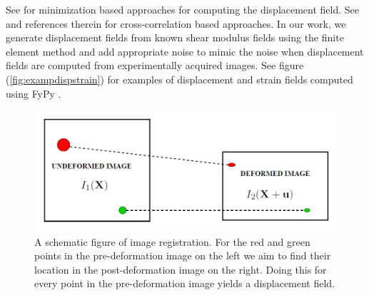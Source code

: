 \documentclass[12pt]{article}
\begin{document}
See \cite{paper:richards2009,paper:gokhale2004,paper:pellot-barakat2004} for minimization based approaches for computing the displacement field. See \cite{paper:ophir1991,paper:ophir1996,paper:alam1998} and references therein for cross-correlation based approaches. In our work, we generate displacement fields from known shear modulus fields using the finite element method \cite{book:hugheslinear,book:fishbelytschko} and add appropriate noise to mimic the noise when displacement fields are computed from experimentally acquired images. See figure (\ref{fig:exampdispstrain}) for examples of displacement and strain fields computed using FyPy \cite{misc:fypy}.
%
\begin{figure}[h]
  \centering
  \includegraphics[totalheight=4cm]{Figures/regist.png}
  \caption{\label{fig:registschematic} A schematic figure of image registration. For the red and green points in the pre-deformation image on the left we aim to find their location in the post-deformation image on the right. Doing this for every point in the pre-deformation image yields a displacement field.}
\end{figure}
%
\end{document}
